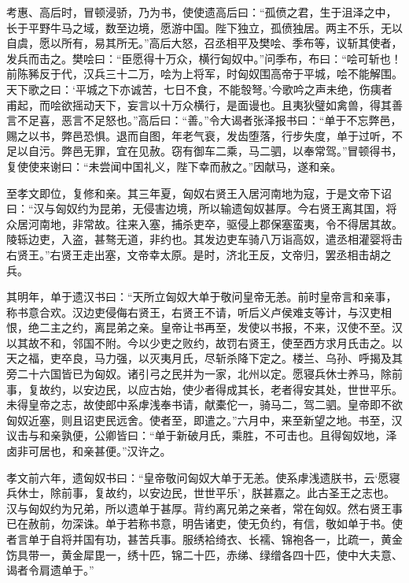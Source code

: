 \documentclass[12pt,UTF8]{ctexbook}
\begin{document}
考惠、高后时，冒顿浸骄，乃为书，使使遗高后曰：“孤偾之君，生于沮泽之中，长于平野牛马之域，数至边境，愿游中国。陛下独立，孤偾独居。两主不乐，无以自虞，愿以所有，易其所无。”高后大怒，召丞相平及樊哙、季布等，议斩其使者，发兵而击之。樊哙曰：“臣愿得十万众，横行匈奴中。”问季布，布曰：“哙可斩也！前陈豨反于代，汉兵三十二万，哙为上将军，时匈奴围高帝于平城，哙不能解围。天下歌之曰：‘平城之下亦诚苦，七日不食，不能彀弩。’今歌吟之声未绝，伤痍者甫起，而哙欲摇动天下，妄言以十万众横行，是面谩也。且夷狄璧如禽兽，得其善言不足喜，恶言不足怒也。”高后曰：“善。”令大谒者张泽报书曰：“单于不忘弊邑，赐之以书，弊邑恐惧。退而自图，年老气衰，发齿堕落，行步失度，单于过听，不足以自污。弊邑无罪，宜在见赦。窃有御车二乘，马二驷，以奉常驾。”冒顿得书，复使使来谢曰：“未尝闻中国礼义，陛下幸而赦之。”因献马，遂和亲。



至孝文即位，复修和亲。其三年夏，匈奴右贤王入居河南地为寇，于是文帝下诏曰：“汉与匈奴约为昆弟，无侵害边境，所以输遗匈奴甚厚。今右贤王离其国，将众居河南地，非常故。往来入塞，捕杀吏卒，驱侵上郡保塞蛮夷，令不得居其故。陵轹边吏，入盗，甚骜无道，非约也。其发边吏车骑八万诣高奴，遣丞相灌婴将击右贤王。”右贤王走出塞，文帝幸太原。是时，济北王反，文帝归，罢丞相击胡之兵。



其明年，单于遗汉书曰：“天所立匈奴大单于敬问皇帝无恙。前时皇帝言和亲事，称书意合欢。汉边吏侵侮右贤王，右贤王不请，听后义卢侯难支等计，与汉吏相恨，绝二主之约，离昆弟之亲。皇帝让书再至，发使以书报，不来，汉使不至。汉以其故不和，邻国不附。今以少吏之败约，故罚右贤王，使至西方求月氏击之。以天之福，吏卒良，马力强，以灭夷月氏，尽斩杀降下定之。楼兰、乌孙、呼揭及其旁二十六国皆已为匈奴。诸引弓之民并为一家，北州以定。愿寝兵休士养马，除前事，复故约，以安边民，以应古始，使少者得成其长，老者得安其处，世世平乐。未得皇帝之志，故使郎中系虖浅奉书请，献橐佗一，骑马二，驾二驷。皇帝即不欲匈奴近塞，则且诏吏民远舍。使者至，即遣之。”六月中，来至新望之地。书至，汉议击与和亲孰便，公卿皆曰：“单于新破月氏，乘胜，不可击也。且得匈奴地，泽卤非可居也，和亲甚便。”汉许之。



孝文前六年，遗匈奴书曰：“皇帝敬问匈奴大单于无恙。使系虖浅遗朕书，云‘愿寝兵休士，除前事，复故约，以安边民，世世平乐’，朕甚嘉之。此古圣王之志也。汉与匈奴约为兄弟，所以遗单于甚厚。背约离兄弟之亲者，常在匈奴。然右贤王事已在赦前，勿深诛。单于若称书意，明告诸吏，使无负约，有信，敬如单于书。使者言单于自将并国有功，甚苦兵事。服绣袷绮衣、长襦、锦袍各一，比疏一，黄金饬具带一，黄金犀毘一，绣十匹，锦二十匹，赤绨、绿缯各四十匹，使中大夫意、谒者令肩遗单于。”
\end{document}
